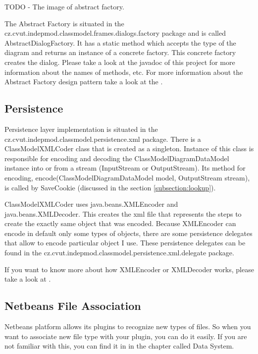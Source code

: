 TODO - The image of abstract factory.

The Abstract Factory is situated in the cz.cvut.indepmod.classmodel.frames.dialogs.factory package and is called AbstractDialogFactory. It has a static method which accepts the type of the diagram and returns an instance of a concrete factory. This concrete factory creates the dialog. Please take a look at the javadoc of this project for more information about the names of methods, etc. For more information about the Abstract Factory design pattern take a look at the \cite{DesignPatterns}.

\subsection{Persistence}
\label{subsection:persistence}

Persistence layer implementation is situated in the cz.cvut.indepmod.classmodel.persistence.xml package. There is a ClassModelXMLCoder class that is created as a singleton. Instance of this class is responsible for encoding and decoding the ClassModelDiagramDataModel instance into or from a stream (InputStream or OutputStream). Its method for encoding, encode(ClassModelDiagramDataModel model, OutputStream stream), is called by SaveCookie (discussed in the section \ref{subsection:lookup}).

ClassModelXMLCoder uses java.beans.XMLEncoder and java.beans.XMLDecoder. This creates the xml file that represents the steps to create the exactly same object that was encoded. Because XMLEncoder can encode in default only some types of objects, there are some persistence delegates that allow to encode particular object I use. These persistence delegates can be found in the cz.cvut.indepmod.classmodel.persistence.xml.delegate package.

If you want to know more about how XMLEncoder or XMLDecoder works, please take a look at \cite{usingXMLEncoder}.

\subsection{Netbeans File Association}
\label{subsection:fileAssociation}

Netbeans platform allows its plugins to recognize new types of files. So when you want to associate new file type with your plugin, you can do it easily. If you are not familiar with this, you can find it in \cite{netbeans6.9DevGuide} in the chapter called Data System.

